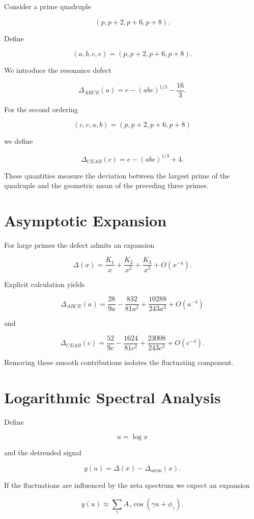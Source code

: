\documentclass[11pt]{article}
\begin{document}
	Consider a prime quadruple
	
	\[
	(p,p+2,p+6,p+8).
	\]
	
	Define
	
	\[
	(a,b,c,e)=(p,p+2,p+6,p+8).
	\]
	
	We introduce the resonance defect
	
	\[
	\Delta_{ABCE}(a)
	=
	e-(abc)^{1/3}-\frac{16}{3}.
	\]
	
	For the second ordering
	
	\[
	(c,e,a,b)=(p,p+2,p+6,p+8)
	\]
	
	we define
	
	\[
	\Delta_{CEAB}(c)
	=
	e-(abc)^{1/3}+4 .
	\]
	
	These quantities measure the deviation between the largest prime of the quadruple and the geometric mean of the preceding three primes.
	
	\section{Asymptotic Expansion}
	
	For large primes the defect admits an expansion
	
	\[
	\Delta(x)
	=
	\frac{K_1}{x}
	+
	\frac{K_2}{x^2}
	+
	\frac{K_3}{x^3}
	+
	O(x^{-4}).
	\]
	
	Explicit calculation yields
	
	\[
	\Delta_{ABCE}(a)
	=
	\frac{28}{9a}
	-
	\frac{832}{81a^2}
	+
	\frac{10288}{243a^3}
	+
	O(a^{-4})
	\]
	
	and
	
	\[
	\Delta_{CEAB}(c)
	=
	\frac{52}{9c}
	-
	\frac{1624}{81c^2}
	+
	\frac{23008}{243c^3}
	+
	O(c^{-4}).
	\]
	
	Removing these smooth contributions isolates the fluctuating component.
	
	\section{Logarithmic Spectral Analysis}
	
	Define
	
	\[
	u=\log x
	\]
	
	and the detrended signal
	
	\[
	y(u)
	=
	\Delta(x)-\Delta_{\text{asym}}(x).
	\]
	
	If the fluctuations are influenced by the zeta spectrum we expect an expansion
	
	\[
	y(u)
	\approx
	\sum_{\gamma}
	A_\gamma
	\cos(\gamma u+\phi_\gamma).
	\]
	
\end{document}
